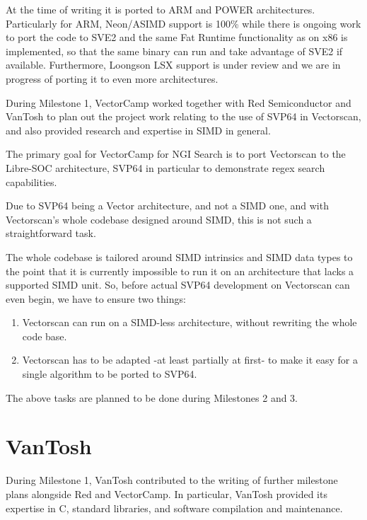 At the time of writing it is ported
to ARM and \acrshort{POWER} architectures. Particularly for ARM, Neon/ASIMD support
is 100\% while there is ongoing work to port the code to \acrshort{SVE2} and
the same Fat Runtime functionality as on x86 is implemented,
so that the same binary can run and take advantage of \acrshort{SVE2} if available.
Furthermore, Loongson LSX support is under review and we are in progress of
porting it to even more architectures.

During Milestone 1, VectorCamp worked together with Red Semiconductor and VanTosh to plan out
the project work relating to the use of \acrshort{SVP64} in Vectorscan, and also provided
research and expertise in \acrshort{SIMD} in general.

The primary goal for VectorCamp for \acrshort{NGI} Search is to port
Vectorscan to the Libre-SOC architecture, \acrshort{SVP64} in particular to demonstrate
regex search capabilities.

Due to \acrshort{SVP64} being a Vector architecture,
and not a \acrshort{SIMD} one, and with Vectorscan’s whole codebase designed around \acrshort{SIMD},
this is not such a straightforward task.

The whole codebase is tailored around \acrshort{SIMD} intrinsics and \acrshort{SIMD} data types to
the point that it is currently impossible to run it on an architecture that
lacks a supported \acrshort{SIMD} unit. So, before actual \acrshort{SVP64} development on Vectorscan
can even begin, we have to ensure two things:

\begin{enumerate}
  \item Vectorscan can run on a \acrshort{SIMD}-less architecture, without rewriting
   the whole code base.
  \item Vectorscan has to be adapted -at least partially at first- to make it easy
   for a single algorithm to be ported to \acrshort{SVP64}.
\end{enumerate}

The above tasks are planned to be done during Milestones 2 and 3.

\section{VanTosh}

During Milestone 1, VanTosh contributed to the writing of further
milestone plans alongside Red and VectorCamp. In particular, VanTosh
provided its expertise in C, standard libraries, and software compilation and
maintenance.

